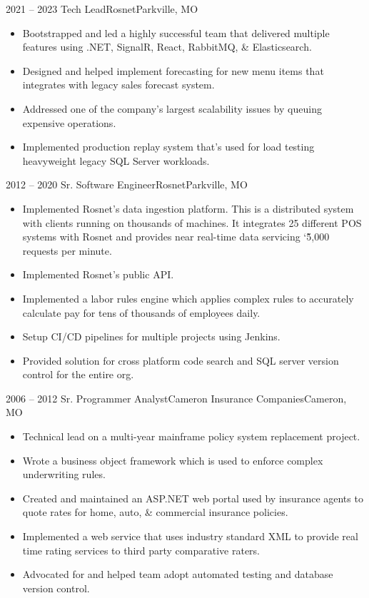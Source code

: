 \documentclass[11pt,letterpaper,final]{moderncv}
\begin{document}
	\cventry
{2021 -- 2023} {Tech Lead}{Rosnet}{Parkville, MO}{}{
		\begin{itemize}
			\item
				Bootstrapped and led a highly successful team that delivered
				multiple features using .NET, SignalR, React, RabbitMQ, \&
				Elasticsearch.
			\item
				Designed and helped implement forecasting for new menu
				items that integrates with legacy sales forecast system.
			\item
				Addressed one of the company's largest scalability issues by
				queuing expensive operations.
			\item
				Implemented production replay system that's used for load
				testing heavyweight legacy SQL Server workloads.
		\end{itemize}
}
\linebreak

	\cventry
{2012 -- 2020} {Sr. Software Engineer}{Rosnet}{Parkville, MO}{}{
		\begin{itemize}
			\item
				Implemented Rosnet's data ingestion platform. This is a
				distributed system with clients running on thousands of
				machines. It integrates 25 different POS systems with Rosnet and
				provides near real-time data servicing \char`\~5,000 requests
				per minute.
			\item
				Implemented Rosnet's public API. 
			\item
				Implemented a labor rules engine which applies complex rules to
				accurately calculate pay for tens of thousands of employees
				daily.
			\item
				Setup CI/CD pipelines for multiple projects using Jenkins.
			\item
				Provided solution for cross platform code search and SQL server
				version control for the entire org.
		\end{itemize}
}
\linebreak

	\cventry
{2006 -- 2012} {Sr. Programmer Analyst}{Cameron Insurance Companies}{Cameron, MO}{}{
		\begin{itemize}
			\item 
				Technical lead on a multi-year mainframe policy system
				replacement project.
			\item 
				Wrote a business object framework which is used to enforce
				complex underwriting rules.
			\item 
				Created and maintained an ASP.NET web portal used by
				insurance agents to quote rates for home, auto, \&
				commercial insurance policies.
			\item 
				Implemented a web service that uses industry standard XML to
				provide real time rating services to third party comparative
				raters.
			\item
				Advocated for and helped team adopt automated testing
				and database version control.
		\end{itemize}
}
\linebreak
\end{document}
